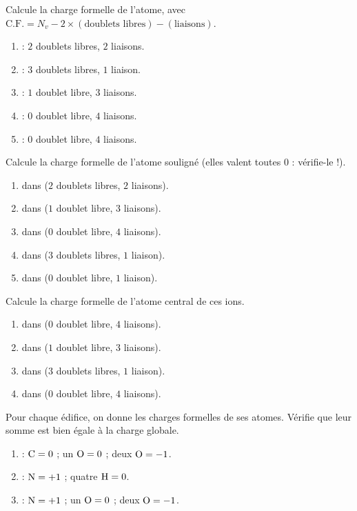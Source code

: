 \documentclass[11pt,a4paper]{article}
\begin{document}
\begin{exo}
Calcule la charge formelle de l'atome, avec
$\mathrm{C.F.} = N_v - 2\times(\text{doublets libres}) - (\text{liaisons})$.
\begin{enumerate}[label=\alph*)]
  \item {} : $2$ doublets libres, $2$ liaisons.
  \item {} : $3$ doublets libres, $1$ liaison.
  \item {} : $1$ doublet libre, $3$ liaisons.
  \item {} : $0$ doublet libre, $4$ liaisons.
  \item {} : $0$ doublet libre, $4$ liaisons.
\end{enumerate}
\end{exo}

\begin{exo}
Calcule la charge formelle de l'atome souligné (elles valent toutes $0$ : vérifie-le !).
\begin{enumerate}[label=\alph*)]
  \item {} dans  ($2$ doublets libres, $2$ liaisons).
  \item {} dans  ($1$ doublet libre, $3$ liaisons).
  \item {} dans  ($0$ doublet libre, $4$ liaisons).
  \item {} dans  ($3$ doublets libres, $1$ liaison).
  \item {} dans  ($0$ doublet libre, $1$ liaison).
\end{enumerate}
\end{exo}

\begin{exo}
Calcule la charge formelle de l'atome central de ces ions.
\begin{enumerate}[label=\alph*)]
  \item {} dans  ($0$ doublet libre, $4$ liaisons).
  \item {} dans  ($1$ doublet libre, $3$ liaisons).
  \item {} dans  ($3$ doublets libres, $1$ liaison).
  \item {} dans  ($0$ doublet libre, $4$ liaisons).
\end{enumerate}
\end{exo}

\begin{exo}
Pour chaque édifice, on donne les charges formelles de ses atomes. Vérifie que leur somme est
bien égale à la charge globale.
\begin{enumerate}[label=\alph*)]
  \item {} : $\ce{C}=0$ ; un $\ce{O}=0$ ; deux $\ce{O}=-1$.
  \item {} : $\ce{N}=+1$ ; quatre $\ce{H}=0$.
  \item {} : $\ce{N}=+1$ ; un $\ce{O}=0$ ; deux $\ce{O}=-1$.
\end{enumerate}
\end{exo}
\end{document}
